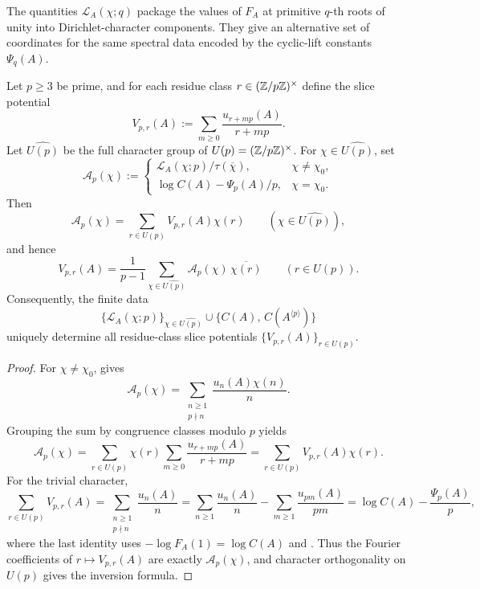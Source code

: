 \begin{remark}
  The quantities \(\mathcal L_A(\chi;q)\) package the values of
  \(F_A\) at primitive \(q\)-th roots of unity into Dirichlet-character
  components. They give an alternative set of coordinates for the same
  spectral data encoded by the cyclic-lift constants \(\Psi_q(A)\).
\end{remark}

\begin{theorem}
  \label{thm:finite-part-dirichlet-character-inversion-prime}
  Let \(p\ge 3\) be prime, and for each residue class
  \(r\in(\mathbb{Z}/p\mathbb{Z})^\times\) define the slice potential
  \[
    V_{p,r}(A):=\sum_{m\ge 0}\frac{u_{r+mp}(A)}{r+mp}.
  \]
  Let \(\widehat{U(p)}\) be the full character group of
  \(U(p)=(\mathbb{Z}/p\mathbb{Z})^\times\). For \(\chi\in\widehat{U(p)}\), set
  \[
    \mathscr A_p(\chi):=
    \begin{cases}
      \mathcal L_A(\chi;p)/\tau(\overline{\chi}),
        & \chi\neq \chi_0,\\[6pt]
      \log C(A)-\Psi_p(A)/p,
        & \chi=\chi_0.
    \end{cases}
  \]
  Then
  \[
    \mathscr A_p(\chi)
    =\sum_{r\in U(p)}V_{p,r}(A)\chi(r)
    \qquad (\chi\in\widehat{U(p)}),
  \]
  and hence
  \[
    V_{p,r}(A)
    =\frac{1}{p-1}\sum_{\chi\in\widehat{U(p)}}
      \mathscr A_p(\chi)\,\overline{\chi(r)}
    \qquad (r\in U(p)).
  \]
  Consequently, the finite data
  \[
    \bigl\{\mathcal L_A(\chi;p)\bigr\}_{\chi\in\widehat{U(p)}}
    \cup \{C(A),\,C(A^{\langle p\rangle})\}
  \]
  uniquely determine all residue-class slice potentials
  \(\{V_{p,r}(A)\}_{r\in U(p)}\).
\end{theorem}

\begin{proof}
  For \(\chi\neq \chi_0\),
   gives
  \[
    \mathscr A_p(\chi)
    =\sum_{\substack{n\ge 1\\ p\nmid n}}
      \frac{u_n(A)\chi(n)}{n}.
  \]
  Grouping the sum by congruence classes modulo \(p\) yields
  \[
    \mathscr A_p(\chi)
    =\sum_{r\in U(p)}\chi(r)
      \sum_{m\ge 0}\frac{u_{r+mp}(A)}{r+mp}
    =\sum_{r\in U(p)}V_{p,r}(A)\chi(r).
  \]
  For the trivial character,
  \[
    \sum_{r\in U(p)}V_{p,r}(A)
    =\sum_{\substack{n\ge 1\\ p\nmid n}}\frac{u_n(A)}{n}
    =\sum_{n\ge 1}\frac{u_n(A)}{n}
      -\sum_{m\ge 1}\frac{u_{pm}(A)}{pm}
    =\log C(A)-\frac{\Psi_p(A)}{p},
  \]
  where the last identity uses
  \(-\log F_A(1)=\log C(A)\) and
  . Thus the
  Fourier coefficients of \(r\mapsto V_{p,r}(A)\) are exactly
  \(\mathscr A_p(\chi)\), and character orthogonality on \(U(p)\) gives
  the inversion formula.
\end{proof}

